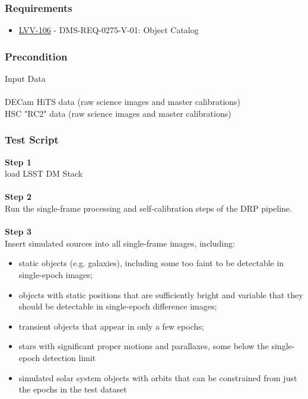 \hypertarget{requirements-44}{%
\subsubsection{Requirements}\label{requirements-44}}

\begin{itemize}
\tightlist
\item
  \href{https://jira.lsstcorp.org/browse/LVV-106}{LVV-106} -
  DMS-REQ-0275-V-01: Object Catalog
\end{itemize}

\hypertarget{precondition-3}{%
\subsubsection{Precondition}\label{precondition-3}}

Input Data\\
~\\
DECam HiTS data (raw science images and master calibrations)\\
HSC "RC2" data (raw science images and master calibrations)

\hypertarget{test-script-44}{%
\subsubsection{Test Script}\label{test-script-44}}

\textbf{Step 1}\\
load LSST DM Stack\\
~\\
\textbf{Step 2}\\
Run the single-frame processing and self-calibration steps of the DRP
pipeline.~\\
~\\
\textbf{Step 3}\\
Insert simulated sources into all single-frame images, including:

\begin{itemize}
\tightlist
\item
  static objects (e.g. galaxies), including some too faint to be
  detectable in single-epoch images;
\item
  objects with static positions that are sufficiently bright and
  variable that they should be detectable in single-epoch difference
  images;
\item
  transient objects that appear in only a few epochs;
\item
  stars with significant proper motions and parallaxes, some below the
  single-epoch detection limit
\item
  simulated solar system objects with orbits that can be constrained
  from just the epochs in the test dataset
\end{itemize}

